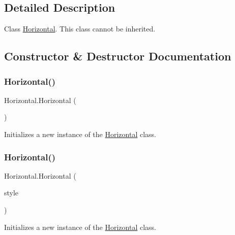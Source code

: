 \subsection{Detailed Description}
Class \hyperlink{class_horizontal}{Horizontal}. This class cannot be inherited. 



\subsection{Constructor \& Destructor Documentation}
\mbox{\label{class_horizontal_ac5c90c94a8392d9c130e8d0bcb3b32fc}} 
\subsubsection{\texorpdfstring{Horizontal()}{Horizontal()}\hspace{0.1cm}{\footnotesize\ttfamily [1/3]}}
{\footnotesize\ttfamily Horizontal.\+Horizontal (\begin{DoxyParamCaption}{ }\end{DoxyParamCaption})\hspace{0.3cm}{\ttfamily [inline]}}



Initializes a new instance of the \hyperlink{class_horizontal}{Horizontal} class. 

\mbox{\label{class_horizontal_a70640fe78e5264944ad7359f6eb9f0d2}} 
\subsubsection{\texorpdfstring{Horizontal()}{Horizontal()}\hspace{0.1cm}{\footnotesize\ttfamily [2/3]}}
{\footnotesize\ttfamily Horizontal.\+Horizontal (\begin{DoxyParamCaption}\item[{G\+U\+I\+Style}]{style }\end{DoxyParamCaption})\hspace{0.3cm}{\ttfamily [inline]}}



Initializes a new instance of the \hyperlink{class_horizontal}{Horizontal} class. 



